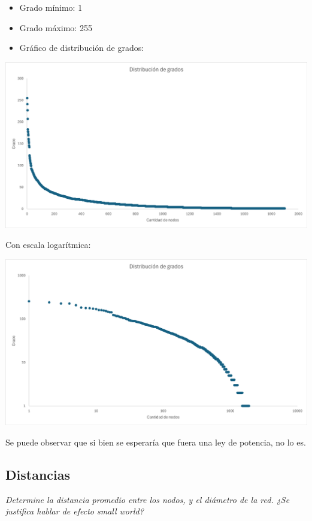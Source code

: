 \documentclass[12pt]{article}
\begin{document}
\begin{itemize}
    \item Grado mínimo: 1
    \item Grado máximo: 255
    \item Gráfico de distribución de grados: 
\end{itemize}
\begin{center}
    \includegraphics[scale=0.35]{images/distribucion_grados.png}
\end{center}
Con escala logarítmica:

\begin{center}
    \includegraphics[scale=0.35]{images/distribucion_grados_log_log.png}
\end{center}

Se puede observar que si bien se esperaría que fuera una ley de potencia, no lo es.
\subsection{Distancias} 
\textit{Determine la distancia promedio entre los nodos, y el diámetro de la red. ¿Se justifica hablar de efecto small world?}
\end{document}
